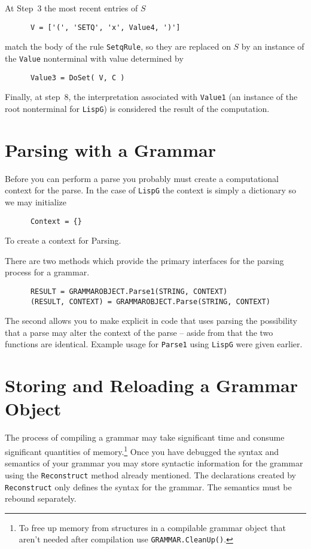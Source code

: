 At Step~3 the most recent entries of $S$ 
\begin{verbatim}
      V = ['(', 'SETQ', 'x', Value4, ')']
\end{verbatim}
match the body of the rule
{\tt SetqRule}, so they are replaced on $S$ by an instance
of the {\tt Value} nonterminal with value determined by
\begin{verbatim}
      Value3 = DoSet( V, C )
\end{verbatim}
Finally, at step~8, the interpretation associated
with {\tt Value1} (an instance of the root nonterminal for
{\tt LispG}) is  considered the result of the computation.

\section{Parsing with a Grammar}

Before you can perform a parse you probably must create a
computational context for the parse.  In the case of {\tt LispG}
the context is simply a dictionary so we may initialize
\begin{verbatim}
      Context = {}
\end{verbatim}
To create a context for Parsing.

There are two methods which provide the primary interfaces for
the parsing process for a grammar.
\begin{verbatim}
      RESULT = GRAMMAROBJECT.Parse1(STRING, CONTEXT)
      (RESULT, CONTEXT) = GRAMMAROBJECT.Parse(STRING, CONTEXT)
\end{verbatim}
The second allows you to make explicit in code that uses parsing
the possibility that a parse may alter the context of the parse
-- aside from that the two functions are identical.  Example
usage for {\tt Parse1} using {\tt LispG} were given earlier.

\section{Storing and Reloading a Grammar Object}

The process of compiling a grammar may take significant time
and consume significant quantities of 
memory.\footnote{To
free up memory from structures in a 
compilable grammar object that aren't
needed after compilation use {\tt GRAMMAR.CleanUp()}.}
Once you have
debugged the syntax and semantics of your grammar you may
store syntactic information for the
grammar using the {\tt Reconstruct}
method already mentioned.  The declarations created by {\tt
Reconstruct} only defines the syntax for the grammar.
The semantics must be rebound separately.

